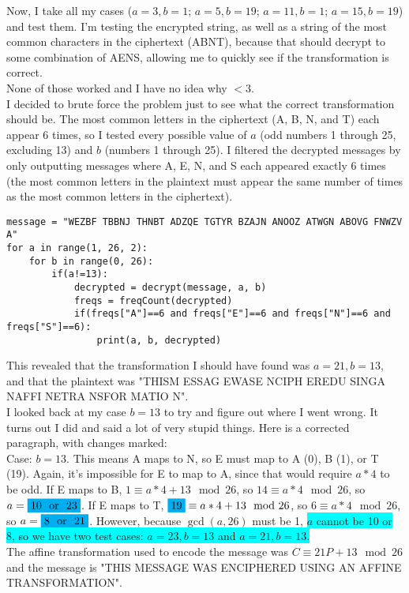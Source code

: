 \documentclass{article}
\begin{document}
\begin{enumerate}
\begin{enumerate}
          \end{enumerate}
          Now, I take all my cases ($a = 3, b = 1$; $a = 5, b = 19$; $a = 11, b = 1$; $a = 15, b = 19$) and test them. I'm testing the encrypted string, as well as a string of the most common characters in the ciphertext (ABNT), because that should decrypt to some combination of AENS, allowing me to quickly see if the transformation is correct.\\
          None of those worked and I have no idea why $<3$.\\

          I decided to brute force the problem just to see what the correct transformation should be. The most common letters in the ciphertext (A, B, N, and T) each appear 6 times, so I tested every possible value of $a$ (odd numbers 1 through 25, excluding 13) and $b$ (numbers 1 through 25). I filtered the decrypted messages by only outputting messages where A, E, N, and S each appeared exactly 6 times (the most common letters in the plaintext must appear the same number of times as the most common letters in the ciphertext).
          \begin{verbatim}
message = "WEZBF TBBNJ THNBT ADZQE TGTYR BZAJN ANOOZ ATWGN ABOVG FNWZV A"
for a in range(1, 26, 2):
    for b in range(0, 26):
        if(a!=13):
            decrypted = decrypt(message, a, b)
            freqs = freqCount(decrypted)
            if(freqs["A"]==6 and freqs["E"]==6 and freqs["N"]==6 and freqs["S"]==6):
                print(a, b, decrypted)
          \end{verbatim}
          This revealed that the transformation I should have found was $a = 21, b = 13$, and that the plaintext was "THISM ESSAG EWASE NCIPH EREDU SINGA NAFFI NETRA NSFOR MATIO N".\\
          I looked back at my case $b = 13$ to try and figure out where I went wrong. It turns out I did and said a lot of very stupid things. Here is a corrected paragraph, with changes marked:\\
          Case: $b = 13$. This means A maps to N, so E must map to A (0), B (1), or T (19). Again, it's impossible for E to map to A, since that would require $a*4$ to be odd. If E maps to B, $1 \equiv a*4 + 13 \mod{26}$, so $14 \equiv a*4 \mod{26}$, so $a = \colorbox{cyan}{10 \text{ or } 23}$. If E maps to T, $\colorbox{cyan}{19}\equiv a*4 + 13 \mod{26}$, so $6 \equiv a*4 \mod{26}$, so $a = \colorbox{cyan}{8 \text{ or } 21}$. However, because $\gcd(a, 26)$ must be 1, \colorbox{cyan}{$a$ cannot be 10 or 8, so we have two test cases: $a=23, b=13$ and $a = 21, b = 13$.}\\
          The affine transformation used to encode the message was $C \equiv 21P + 13 \mod{26}$ and the message is "THIS MESSAGE WAS ENCIPHERED USING AN AFFINE TRANSFORMATION".


\end{enumerate}
\end{document}
